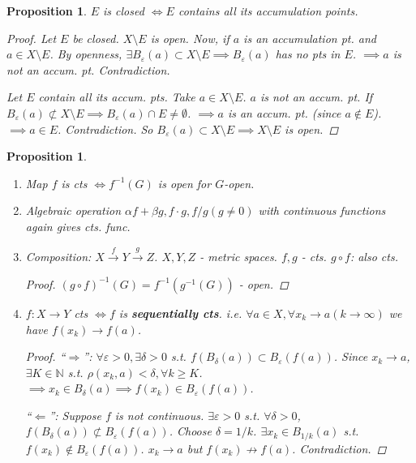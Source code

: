 \documentclass[12pt]{article}
\theoremstyle{blueplain}
\newtheorem{proposition}[theorem]{Proposition}
\theoremstyle{bluedef}
\theoremstyle{blueremark}
\newcommand{\N}{\mathbb{N}}
\newcommand{\eps}{\varepsilon}
\numberwithin{equation}{section}
\begin{document}
      \begin{proposition}
        $E$ is closed $\iff E$ contains all its accumulation points.
        \begin{proof}
          Let $E$ be closed. $X \setminus E$ is open.
          Now, if $a$ is an accumulation pt. and $a \in X \setminus E$.
          By openness, $\exists B_\eps(a) \subset X \setminus E \implies B_\eps(a)$ has no pts in $E$.
          $\implies a$ is not an accum. pt. Contradiction.

          Let $E$ contain all its accum. pts.
          Take $a \in X \setminus E$. $a$ is not an accum. pt.
          If $B_\eps(a) \not\subset X \setminus E \implies B_\eps(a) \cap E \neq \emptyset$.
          $\implies a$ is an accum. pt. (since $a \notin E$).
          $\implies a \in E$. Contradiction.
          So $B_\eps(a) \subset X \setminus E \implies X \setminus E$ is open.
        \end{proof}
      \end{proposition}

      \begin{proposition}
        \begin{enumerate}
          \item Map $f$ is cts $\iff f^{-1}(G)$ is open for $G$-open.
          \item Algebraic operation $\alpha f + \beta g, f \cdot g, f/g (g \neq 0)$ with continuous functions again gives cts. func.
          \item Composition: $X \xrightarrow{f} Y \xrightarrow{g} Z$. $X, Y, Z$ - metric spaces. $f, g$ - cts. $g \circ f$: also cts.
                \begin{proof}
                  $(g \circ f)^{-1}(G) = f^{-1}(g^{-1}(G))$ - open.
                \end{proof}
          \item $f: X \to Y$ cts $\iff f$ is \textbf{sequentially cts}. i.e. $\forall a \in X, \forall x_k \to a (k \to \infty)$ we have $f(x_k) \to f(a)$.
                \begin{proof}
                  ``$\Rightarrow$'': $\forall \eps > 0, \exists \delta > 0$ s.t. $f(B_\delta(a)) \subset B_\eps(f(a))$.
                  Since $x_k \to a$, $\exists K \in \N$ s.t. $\rho(x_k, a) < \delta, \forall k \ge K$.
                  $\implies x_k \in B_\delta(a) \implies f(x_k) \in B_\eps(f(a))$.

                  ``$\Leftarrow$'': Suppose $f$ is not continuous. $\exists \eps > 0$ s.t. $\forall \delta > 0$, $f(B_\delta(a)) \not\subset B_\eps(f(a))$.
                  Choose $\delta = 1/k$. $\exists x_k \in B_{1/k}(a)$ s.t. $f(x_k) \notin B_\eps(f(a))$.
                  $x_k \to a$ but $f(x_k) \not\to f(a)$. Contradiction.
                \end{proof}
        \end{enumerate}
      \end{proposition}
\end{document}
